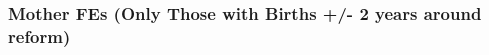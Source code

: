 \documentclass[10pt,letterpaper,subeqn,table]{beamer}
\begin{document}
\begin{frame}[label=FE2]
\frametitle{Mother FEs (Only Those with Births +/- 2 years around reform)}

\footnotesize{\hyperlink{Summary}{}}
\end{frame}


\begin{frame}[label=lowEd]
  
\footnotesize{\hyperlink{Summary}{}}
\end{frame}

\begin{frame}[label=highEd]
  
\footnotesize{\hyperlink{Summary}{}}
\end{frame}

\end{document}
